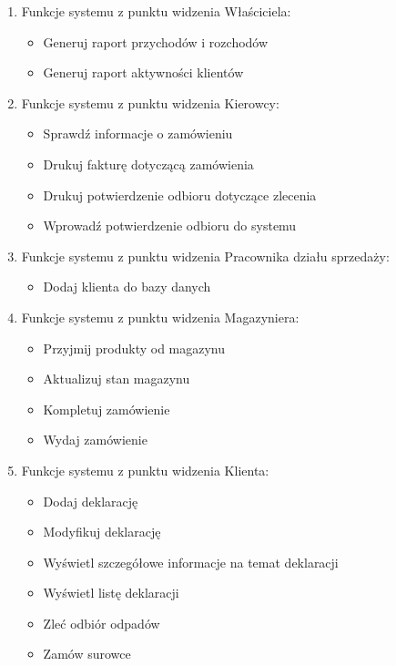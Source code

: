
\begin{enumerate}
\item Funkcje systemu z punktu widzenia Właściciela:
	\begin{itemize}
		\item Generuj raport przychodów i rozchodów
		\item Generuj raport aktywności klientów
	\end{itemize}

\item Funkcje systemu z punktu widzenia Kierowcy:
	\begin{itemize}
		\item Sprawdź informacje o zamówieniu
		\item Drukuj fakturę dotyczącą zamówienia
		\item Drukuj potwierdzenie odbioru dotyczące zlecenia
		\item Wprowadź potwierdzenie odbioru do systemu
	\end{itemize}

\item Funkcje systemu z punktu widzenia Pracownika działu sprzedaży:
	\begin{itemize}
		\item Dodaj klienta do bazy danych
	\end{itemize} 

\item Funkcje systemu z punktu widzenia Magazyniera:
	\begin{itemize}
		\item Przyjmij produkty od magazynu 
		\item Aktualizuj stan magazynu
		\item Kompletuj zamówienie
		\item Wydaj zamówienie
	\end{itemize}

\item Funkcje systemu z punktu widzenia Klienta:
	\begin{itemize}
		\item Dodaj deklarację
		\item Modyfikuj deklarację
		\item Wyświetl szczegółowe informacje na temat deklaracji
		\item Wyświetl listę deklaracji
		\item Zleć odbiór odpadów
		\item Zamów surowce
	\end{itemize}


\end{enumerate}
